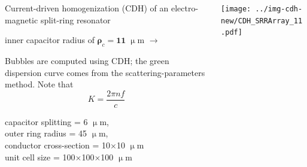\documentclass[t]{beamer} \usepackage[english]{babel} \usepackage[utf8]{inputenc} \usetheme{Frankfurt} %
\begin{document}
\begin{frame}[plain]{}%
\begin{columns}[T] %
	\begin{column}{.55\textwidth}
	\vspace{3mm}
	\noindent Current-driven homogenization (CDH) of an electro-magnetic split-ring resonator 
	\begin{exampleblock}\hfill inner capacitor radius of $\pmb\rho_c=\pmb{11}\;\upmu$m $\rightarrow$\end{exampleblock}
	\vspace{3mm}

	\noindent Bubbles are computed using CDH; the green dispersion curve comes from the scattering-parameters method. Note that $$K = \frac{2\pi n f}{c}$$
	\vspace{12mm}

	\small{capacitor splitting = 6 $\upmu$m,\\ outer ring radius = 45 $\upmu$m,\\ conductor cross-section = 10$\times$10 $\upmu$m\\ unit cell size = 100$\times$100$\times$100 $\upmu$m}
	\vspace{5mm}

	\end{column}%
	\begin{column}{.45\textwidth}%
		\vspace{-1mm}\texttt{[image: ../img-cdh-new/CDH\_SRRArray\_11.pdf]} 
	\end{column}
\end{columns}
\end{frame} 		%
\end{document}
